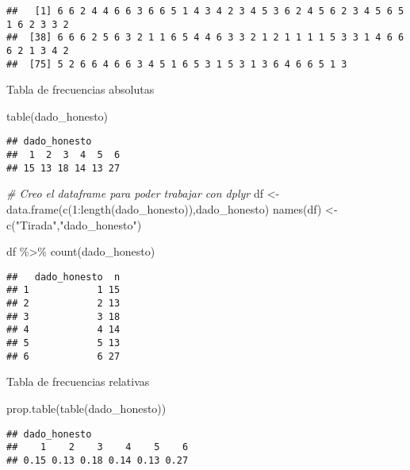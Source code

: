 \documentclass[
]{article}
\newenvironment{Shaded}{\begin{snugshade}}{\end{snugshade}}
\newcommand{\CommentTok}[1]{\textcolor[rgb]{0.56,0.35,0.01}{\textit{#1}}}
\newcommand{\DecValTok}[1]{\textcolor[rgb]{0.00,0.00,0.81}{#1}}
\newcommand{\FunctionTok}[1]{\textcolor[rgb]{0.00,0.00,0.00}{#1}}
\newcommand{\NormalTok}[1]{#1}
\newcommand{\OtherTok}[1]{\textcolor[rgb]{0.56,0.35,0.01}{#1}}
\newcommand{\SpecialCharTok}[1]{\textcolor[rgb]{0.00,0.00,0.00}{#1}}
\newcommand{\StringTok}[1]{\textcolor[rgb]{0.31,0.60,0.02}{#1}}
\begin{document}
\begin{verbatim}
##   [1] 6 6 2 4 4 6 6 3 6 6 5 1 4 3 4 2 3 4 5 3 6 2 4 5 6 2 3 4 5 6 5 1 6 2 3 3 2
##  [38] 6 6 6 2 5 6 3 2 1 1 6 5 4 4 6 3 3 2 1 2 1 1 1 1 5 3 3 1 4 6 6 6 2 1 3 4 2
##  [75] 5 2 6 6 4 6 6 3 4 5 1 6 5 3 1 5 3 1 3 6 4 6 6 5 1 3
\end{verbatim}

Tabla de frecuencias absolutas

\begin{Shaded}
\begin{Highlighting}[]
\FunctionTok{table}\NormalTok{(dado\_honesto)}
\end{Highlighting}
\end{Shaded}

\begin{verbatim}
## dado_honesto
##  1  2  3  4  5  6 
## 15 13 18 14 13 27
\end{verbatim}

\begin{Shaded}
\begin{Highlighting}[]
\CommentTok{\# Creo el dataframe para poder trabajar con dplyr}
\NormalTok{df }\OtherTok{\textless{}{-}} \FunctionTok{data.frame}\NormalTok{(}\FunctionTok{c}\NormalTok{(}\DecValTok{1}\SpecialCharTok{:}\FunctionTok{length}\NormalTok{(dado\_honesto)),dado\_honesto)}
\FunctionTok{names}\NormalTok{(df) }\OtherTok{\textless{}{-}} \FunctionTok{c}\NormalTok{(}\StringTok{"Tirada"}\NormalTok{,}\StringTok{"dado\_honesto"}\NormalTok{)}

\NormalTok{df }\SpecialCharTok{\%\textgreater{}\%} 
  \FunctionTok{count}\NormalTok{(dado\_honesto)}
\end{Highlighting}
\end{Shaded}

\begin{verbatim}
##   dado_honesto  n
## 1            1 15
## 2            2 13
## 3            3 18
## 4            4 14
## 5            5 13
## 6            6 27
\end{verbatim}

Tabla de frecuencias relativas

\begin{Shaded}
\begin{Highlighting}[]
\FunctionTok{prop.table}\NormalTok{(}\FunctionTok{table}\NormalTok{(dado\_honesto))}
\end{Highlighting}
\end{Shaded}

\begin{verbatim}
## dado_honesto
##    1    2    3    4    5    6 
## 0.15 0.13 0.18 0.14 0.13 0.27
\end{verbatim}
\end{document}
